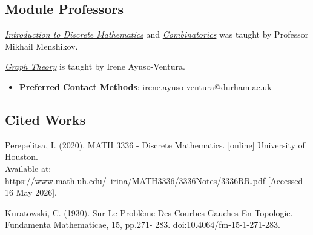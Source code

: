 \subsection{Module Professors}

\hyperref[dm:section:1.idm]{\textit{Introduction to Discrete Mathematics}} and \hyperref[dm:section:2.com]{\textit{Combinatorics}} was taught by Professor Mikhail Menshikov.
    
\hyperref[dm:section:3.gt]{\textit{Graph Theory}} is taught by Irene Ayuso-Ventura.
\begin{itemize}
    \item \textbf{Preferred Contact Methods}: irene.ayuso-ventura@durham.ac.uk
\end{itemize}

\subsection{Cited Works}

Perepelitsa, I. (2020). MATH 3336 - Discrete Mathematics. [online] University of Houston. \\ Available at: https://www.math.uh.edu/~irina/MATH3336/3336Notes/3336RR.pdf [Accessed 16 May 2026].\label{cit:recurrenceRelation}

Kuratowski, C. (1930). Sur Le Problème Des Courbes Gauches En Topologie. Fundamenta Mathematicae, 15, pp.271- 283. doi:10.4064/fm-15-1-271-283.\label{cit:planar}